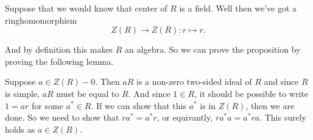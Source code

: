 Suppose that we would know that center of $R$ is a field. Well then we've got a ringhomomorphism 
\[Z(R) \to Z(R) : r \mapsto r .\]
\par And by definition this makes $R$ an algebra. So we can prove the proposition by proving the following lemma. 

Suppose $a\in Z(R)-{0}$. Then $aR$ is a non-zero two-sided ideal of $R$ and since $R$ is simple, $aR$ must be equal to $R$. And since $1 \in R$, it should be possible to write $1 = ar$ for some $a^* \in R$. If we can show that this $a^*$ is in $Z(R)$, then we are done. So we need to show that $ra^*=a^*r$, or equivantly, $ra^*a=a^*ra$. This surely holds as $a\in Z(R)$. 

